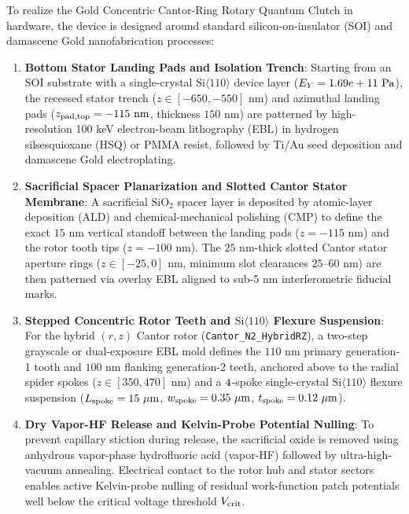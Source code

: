 \documentclass[11pt,letterpaper]{article}
\begin{document}
To realize the Gold Concentric Cantor-Ring Rotary Quantum Clutch in hardware, the device is designed around standard silicon-on-insulator (SOI) and damascene Gold nanofabrication processes:
\begin{enumerate}
    \item \textbf{Bottom Stator Landing Pads and Isolation Trench}: Starting from an SOI substrate with a single-crystal $\text{Si}\langle 110\rangle$ device layer ($E_Y = 1.69e+11{}\text{ Pa}$), the recessed stator trench ($z \in [-650, -550]\text{ nm}$) and azimuthal landing pads ($z_{\rm pad,top} = -115\text{ nm}$, thickness $150\text{ nm}$) are patterned by high-resolution 100 keV electron-beam lithography (EBL) in hydrogen silsesquioxane (HSQ) or PMMA resist, followed by Ti/Au seed deposition and damascene Gold electroplating.
    \item \textbf{Sacrificial Spacer Planarization and Slotted Cantor Stator Membrane}: A sacrificial $\text{SiO}_2$ spacer layer is deposited by atomic-layer deposition (ALD) and chemical-mechanical polishing (CMP) to define the exact $15\text{ nm}$ vertical standoff between the landing pads ($z = -115\text{ nm}$) and the rotor tooth tips ($z = -100\text{ nm}$). The $25\text{ nm}$-thick slotted Cantor stator aperture rings ($z \in [-25, 0]\text{ nm}$, minimum slot clearances $25\text{--}60\text{ nm}$) are then patterned via overlay EBL aligned to sub-5 nm interferometric fiducial marks.
    \item \textbf{Stepped Concentric Rotor Teeth and $\text{Si}\langle 110\rangle$ Flexure Suspension}: For the hybrid $(r,z)$ Cantor rotor (\texttt{Cantor\_N2\_HybridRZ}), a two-step grayscale or dual-exposure EBL mold defines the $110\text{ nm}$ primary generation-1 tooth and $100\text{ nm}$ flanking generation-2 teeth, anchored above to the radial spider spokes ($z \in [350, 470]\text{ nm}$) and a $4{}$-spoke single-crystal $\text{Si}\langle 110\rangle$ flexure suspension ($L_{\rm spoke} = \NatureRotCeightCompactNtwoLateralStabilityLSpokeUm{}\ \mu\text{m}$, $w_{\rm spoke} = \NatureRotCeightCompactNtwoLateralStabilityWSpokeUm{}\ \mu\text{m}$, $t_{\rm spoke} = \NatureRotCeightCompactNtwoLateralStabilityTSpokeUm{}\ \mu\text{m}$).
    \item \textbf{Dry Vapor-HF Release and Kelvin-Probe Potential Nulling}: To prevent capillary stiction during release, the sacrificial oxide is removed using anhydrous vapor-phase hydrofluoric acid (vapor-HF) followed by ultra-high-vacuum annealing. Electrical contact to the rotor hub and stator sectors enables active Kelvin-probe nulling of residual work-function patch potentials well below the critical voltage threshold $V_{\rm crit}$.
\end{enumerate}
\end{document}
